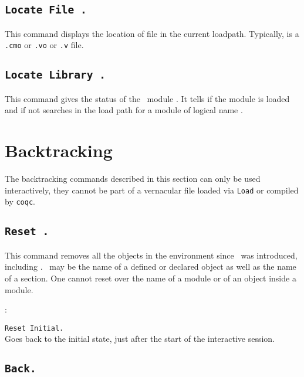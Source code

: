 \subsection[\tt Locate File {\str}.]{\tt Locate File {\str}.\label{Locate File}}
This command displays the location of file {\str} in the current loadpath.
Typically, {\str} is a \texttt{.cmo} or \texttt{.vo} or \texttt{.v} file.

\subsection[\tt Locate Library {\dirpath}.]{\tt Locate Library {\dirpath}.\label{Locate Library}}
This command gives the status of the \Coq\ module {\dirpath}. It tells if the
module is loaded and if not searches in the load path for a module
of logical name {\dirpath}.

\section{Backtracking}

The backtracking commands described in this section can only be used
interactively, they cannot be part of a vernacular file loaded via
{\tt Load} or compiled by {\tt coqc}.

\subsection[\tt Reset \ident.]{\tt Reset \ident.}
This command removes all the objects in the environment since \ident\
was introduced, including \ident. \ident\ may be the name of a defined
or declared object as well as the name of a section. One cannot reset
over the name of a module or of an object inside a module.

\begin{ErrMsgs}
\item \ident: 
\end{ErrMsgs}

\begin{Variants}
 \item {\tt Reset Initial.}\\
   Goes back to the initial state, just after the start of the
   interactive session.
\end{Variants}

\subsection[\tt Back.]{\tt Back.}

